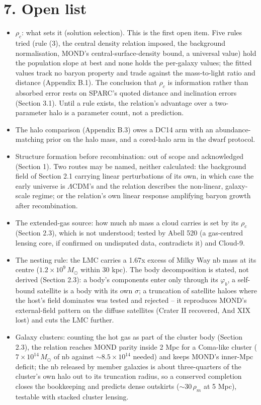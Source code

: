 \documentclass[
  10pt,
]{article}
\begin{document}
\section{7. Open list}\label{open-list}
\begin{itemize}
\item $\rho_c$: what sets it (solution selection). This is the first open item. Five rules tried (rule (3), the central density relation imposed, the background normalisation, MOND's central-surface-density bound, a universal value) hold the population slope at best and none holds the per-galaxy values; the fitted values track no baryon property and trade against the mass-to-light ratio and distance (Appendix B.1). The conclusion that $\rho_c$ is information rather than absorbed error rests on SPARC's quoted distance and inclination errors (Section 3.1). Until a rule exists, the relation's advantage over a two-parameter halo is a parameter count, not a prediction.
\item The halo comparison (Appendix B.3) owes a DC14 arm with an abundance-matching prior on the halo mass, and a cored-halo arm in the dwarf protocol.
\item Structure formation before recombination: out of scope and acknowledged (Section 1). Two routes may be named, neither calculated: the background field of Section 2.1 carrying linear perturbations of its own, in which case the early universe is $\Lambda$CDM's and the relation describes the non-linear, galaxy-scale regime; or the relation's own linear response amplifying baryon growth after recombination.
\item The extended-gas source: how much nb mass a cloud carries is set by its $\rho_c$ (Section 2.3), which is not understood; tested by Abell 520 (a gas-centred lensing core, if confirmed on undisputed data, contradicts it) and Cloud-9.
\item The nesting rule: the LMC carries a 1.67x excess of Milky Way nb mass at its centre ($1.2\times10^9\,M_\odot$ within 30 kpc). The body decomposition is stated, not derived (Section 2.3): a body's components enter only through its $\varphi_b$, a self-bound satellite is a body with its own $\sigma$; a truncation of satellite haloes where the host's field dominates was tested and rejected -- it reproduces MOND's external-field pattern on the diffuse satellites (Crater II recovered, And XIX lost) and cuts the LMC further.
\item Galaxy clusters: counting the hot gas as part of the cluster body (Section 2.3), the relation reaches MOND parity inside 2 Mpc for a Coma-like cluster ($7\times10^{14}\,M_\odot$ of nb against $\sim8.5\times10^{14}$ needed) and keeps MOND's inner-Mpc deficit; the nb released by member galaxies is about three-quarters of the cluster's own halo out to its truncation radius, so a conserved completion closes the bookkeeping and predicts dense outskirts ($\sim30\,\rho_m$ at 5 Mpc), testable with stacked cluster lensing.

\end{itemize}
\end{document}
